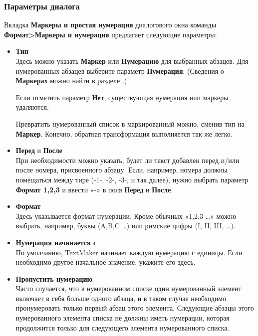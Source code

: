 ﻿\documentclass[a4paper,10pt]{article}
\begin{document}
\subsubsection{Параметры диалога}
Вкладка \textbf{Маркеры и простая нумерация} диалогового окна команды \textbf{Формат>Маркеры и нумерация} предлагает следующие параметры:
\begin{itemize}
 \item \textbf{Тип}\\
 Здесь можно указать \textbf{Маркер} или \textbf{Нумерацию} для выбранных абзацев. Для нумерованных абзацев выберите параметр \textbf{Нумерация}. (Сведения о \textbf{Маркерах} можно найти в разделе .)
 
 Если отметить параметр \textbf{Нет}, существующая нумерация или маркеры удаляются.
 
 Превратить нумерованный список в маркированный можно, сменив тип на \textbf{Маркер}. Конечно, обратная трансформация выполняется так же легко.
 \item \textbf{Перед} и \textbf{После}\\
 При необходимости можно указать, будет ли текст добавлен перед и/или после номера, присвоенного абзацу. Если, например, номера должны помещаться между тире (-1-, -2-, -3-, и так далее), нужно выбрать параметр \textbf{Формат 1,2,3} и ввести «-» в поля \textbf{Перед} и \textbf{После}.
 \item \textbf{Формат}\\
 Здесь указывается формат нумерации. Кроме обычных «1,2,3 …» можно выбрать, например, буквы (A,B,C …) или римские цифры (I, II, III, …).
 \item \textbf{Нумерация начинается с}\\
 По умолчанию, TextMaker начинает каждую нумерацию с единицы. Если необходимо другое начальное значение, укажите его здесь.
 \item \textbf{Пропустить нумерацию}\\
 Часто случается, что в нумерованном списке один нумерованный элемент включает в себя больше одного абзаца, и в таком случае необходимо пронумеровать только первый абзац этого элемента. Следующие абзацы этого нумерованного элемента списка не должны иметь нумерации, которая продолжится только для следующего элемента нумерованного списка.
 

\end{itemize}
\end{document}
